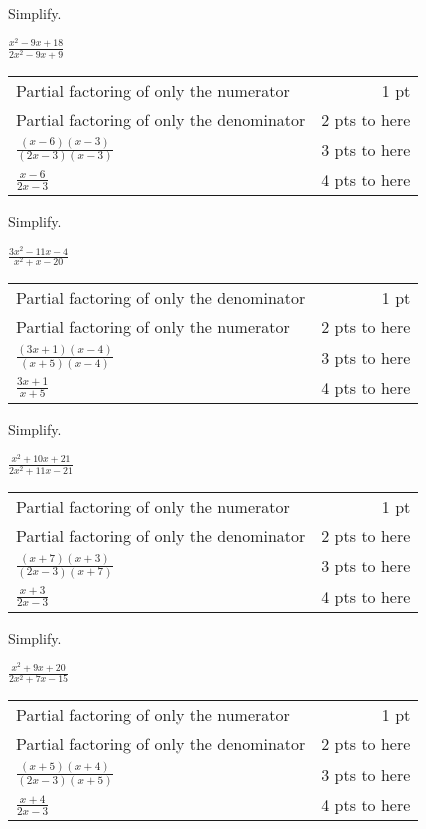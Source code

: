 {
	Simplify.\par
	$\displaystyle \frac{x^2-9x+18}{2x^2-9x+9}$
}
{
	\begin{tabular}{l r}
Partial factoring of only the numerator & 1 pt\\
Partial factoring of only the denominator & 2 pts to here\\
$\frac{(x-6)(x-3)}{(2x-3)(x-3)}$ & 3 pts to here\\
$\frac{x-6}{2x-3}$ & 4 pts to here
\end{tabular}
}

{
	Simplify.\par
	$ \displaystyle \frac{3x^2-11x-4}{x^2+x-20}$
}
{
	\begin{tabular}{l r}
Partial factoring of only the denominator & 1 pt\\
Partial factoring of only the numerator & 2 pts to here\\
$\frac{(3x+1)(x-4)}{(x+5)(x-4)}$ & 3 pts to here\\
$\frac{3x+1}{x+5}$ & 4 pts to here
\end{tabular}
}

{
	Simplify.\par
	$ \displaystyle \frac{x^2+10x+21}{2x^2+11x-21}$
}
{
	\begin{tabular}{l r}
Partial factoring of only the numerator & 1 pt\\
Partial factoring of only the denominator & 2 pts to here\\
$\frac{(x+7)(x+3)}{(2x-3)(x+7)}$ & 3 pts to here\\
$\frac{x+3}{2x-3}$ & 4 pts to here
\end{tabular}
}

{
	Simplify.\par
	$ \displaystyle \frac{x^2+9x+20}{2x^2+7x-15}$
}
{
	\begin{tabular}{l r}
Partial factoring of only the numerator & 1 pt\\
Partial factoring of only the denominator & 2 pts to here\\
$\frac{(x+5)(x+4)}{(2x-3)(x+5)}$ & 3 pts to here\\
$\frac{x+4}{2x-3}$ & 4 pts to here
\end{tabular}
}
